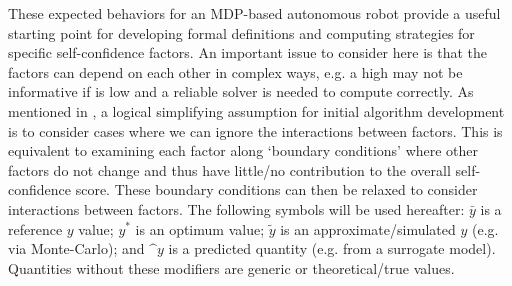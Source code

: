 These expected behaviors for an MDP-based autonomous robot provide a useful starting point for developing formal definitions and computing strategies for specific self-confidence factors. 
An important issue to consider here is that the factors can depend on each other in complex ways, e.g. a high \xO{} may not be informative if \xQ{} is low and a reliable solver is needed to compute \xO{} correctly. %
As mentioned in \cite{Aitken2016-cv}, a logical simplifying assumption for initial algorithm development is to consider cases where we can ignore the interactions between factors. 
This is equivalent to examining each factor along `boundary conditions' where other factors do not change and thus have little/no contribution to the overall self-confidence score. These boundary conditions can then be relaxed to consider interactions between factors. 
The following symbols will be used hereafter: $\bar{y}$ is a reference $y$ value; $y^*$ is an optimum value; $\tilde{y}$ is an approximate/simulated $y$ (e.g. via Monte-Carlo); and $\^{y}$ is a predicted quantity (e.g. from a surrogate model). Quantities without these modifiers are generic or theoretical/true values. 
